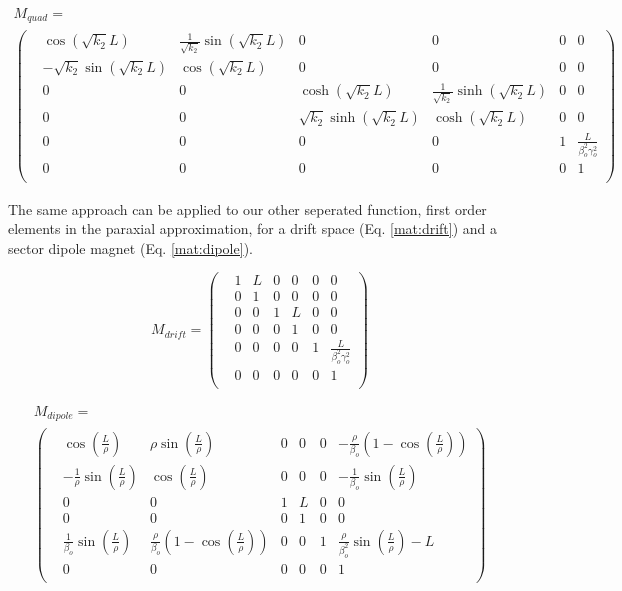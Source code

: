 \begin{multline} \label{mat:quad}
	M_{quad} = \\
\begin{pmatrix} 
	&\cos{\left(\sqrt{k_2} L\right)} &\frac{1}{\sqrt{k_2}}\sin{\left(\sqrt{k_2} L\right)} &0 &0 &0 &0\\
	&-\sqrt{k_2}\sin{\left(\sqrt{k_2} L\right)} &\cos{\left(\sqrt{k_2} L\right)} &0 &0 &0 &0\\
	&0 &0 &\cosh{\left(\sqrt{k_2} L\right)} &\frac{1}{\sqrt{k_2}}\sinh{\left(\sqrt{k_2} L\right)} &0 &0\\
	&0 &0 &\sqrt{k_2}\sinh{\left(\sqrt{k_2} L\right)} &\cosh{\left(\sqrt{k_2} L\right)} &0 &0\\
	&0 &0 &0 &0 &1 &\frac{L}{\beta_o^2\gamma_o^2}\\
	&0 &0 &0 &0 &0 &1\\
\end{pmatrix}
\end{multline}

The same approach can be applied to our other seperated function, first order elements in the paraxial approximation, for a drift space (Eq. \ref{mat:drift}) and a sector dipole magnet (Eq. \ref{mat:dipole}).

\begin{equation} \label{mat:drift}
	M_{drift} =
\begin{pmatrix}
	&1 &L &0 &0 &0 &0\\
	&0 &1 &0 &0 &0 &0\\
	&0 &0 &1 &L &0 &0\\
	&0 &0 &0 &1 &0 &0\\
	&0 &0 &0 &0 &1 &\frac{L}{\beta_o^2\gamma_o^2}\\
	&0 &0 &0 &0 &0 &1\\
\end{pmatrix}
\end{equation}

\begin{multline} \label{mat:dipole}
	M_{dipole} = \\
\begin{pmatrix}
	&\cos{\left(\frac{L}{\rho}\right)} &\rho \sin{\left(\frac{L}{\rho}\right)} &0 &0 &0 &-\frac{\rho}{\beta_o}\left(1 - \cos{\left(\frac{L}{\rho}\right)}\right)\\
	&-\frac{1}{\rho}\sin{\left(\frac{L}{\rho}\right)} &\cos{\left(\frac{L}{\rho}\right)} &0 &0 &0 &-\frac{1}{\beta_o}\sin{\left(\frac{L}{\rho}\right)}\\
	&0 &0 &1 &L &0 &0\\
	&0 &0 &0 &1 &0 &0\\
	&\frac{1}{\beta_o}\sin{\left(\frac{L}{\rho}\right)} &\frac{\rho}{\beta_o}\left(1 - \cos{\left(\frac{L}{\rho}\right)}\right) &0 &0 &1 &\frac{\rho}{\beta_o^2}\sin{\left(\frac{L}{\rho}\right)} - L\\
	&0 &0 &0 &0 &0 &1\\
\end{pmatrix}
\end{multline}


